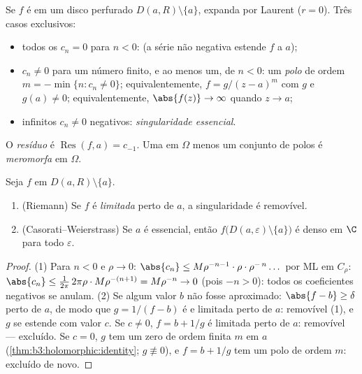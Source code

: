 \begin{definition}\label{def:b3:residues:singularities}
Se $f$ é  em um disco perfurado $D(a, R)\setminus
\{a\}$, expanda por Laurent
($r = 0$). Três casos exclusivos:
\begin{itemize}
  \item todos os $c_n = 0$ para $n < 0$: \emph{}
        (a série não negativa estende $f$  a
        $a$);
  \item $c_n \neq 0$ para um número finito, e ao menos um, de $n < 0$: um
        \emph{polo} de ordem $m = -\min\{n : c_n \neq 0\}$; equivalentemente, $f = g/(z-a)^m$ com $g$
         e $g(a)
        \neq 0$; equivalentemente, $\abs{f(z)} \to \infty$ quando $z\to
        a$;
  \item infinitos $c_n \neq 0$ negativos: \emph{singularidade essencial}.
\end{itemize}
O \emph{resíduo} é $\operatorname{Res}(f, a) = c_{-1}$. Uma  em
$\Omega$ menos um conjunto de polos é
\emph{meromorfa} em $\Omega$.
\end{definition}

\begin{theorem}
\label{thm:b3:residues:riemanncw}
Seja $f$  em $D(a,R)\setminus\{a\}$.
\begin{enumerate}
  \item (Riemann) Se $f$ é \emph{limitada} perto de $a$, a
        singularidade é removível.
  \item (Casorati--Weierstrass) Se $a$ é essencial, então $f\bigl(D(a,\varepsilon)\setminus\{a\}\bigr)$ é
        denso em $\C$ para todo $\varepsilon$.
\end{enumerate}
\end{theorem}

\begin{proof}
(1) Para $n < 0$ e $\rho \to 0$: $\abs{c_n} \leq
M\rho^{-n-1}\cdot\rho\cdot\rho^{-\,n}\dots$ por ML em $C_\rho$: $\abs{c_n} \leq \frac{1}{2\pi}\,2\pi\rho\cdot
M\rho^{-(n+1)} = M\rho^{-n} \to 0$ (pois
$-n > 0$): todos os coeficientes negativos se anulam.
(2) Se algum valor $b$ não fosse aproximado: $\abs{f - b} \geq
\delta$ perto de
$a$, de modo que $g = 1/(f - b)$ é  e limitada perto de $a$:
removível (1), e $g$ se estende com valor $c$. Se $c \neq 0$, $f = b + 1/g$ é
limitada perto de $a$: removível --- excluído. Se $c = 0$,
$g$ tem um zero de ordem finita $m$ em $a$
(\cref{thm:b3:holomorphic:identity}; $g \not\equiv 0$), e $f = b + 1/g$ tem um polo de ordem $m$: excluído
de novo.
\end{proof}


